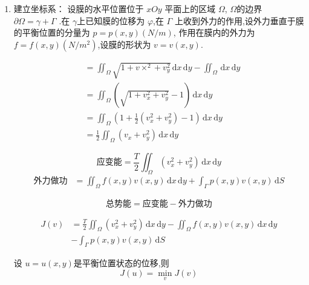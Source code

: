 \documentclass[../../PDE.tex]{subfiles}
\begin{document}
\begin{enumerate}
    \item 建立坐标系：
    设膜的水平位置位于 \(  xOy  \) 平面上的区域 \(   \Omega   \),  \(   \Omega   \)的边界 \(  \partial  \Omega =  \gamma +  \Gamma   \)   .在 \(   \gamma   \)上已知膜的位移为 \(   \varphi   \),在 \(   \Gamma   \)   上收到外力的作用,设外力垂直于膜的平衡位置的分量为 \(  p = p\left( x,y \right) \left( N /m \right)    \),
    作用在膜内的外力为 \(  f =  f\left( x,y \right)\left(  N / m^{2} \right)    \),设膜的形状为 \(  v =  v\left( x,y \right)   \).
    
    
    \[
    \begin{aligned}& =  \iint_{ \Omega } \sqrt{ 1+ v\times ^{2}+ v_{y}^{2}}\,\mathrm{d} x\,\mathrm{d} y - \iint_{ \Omega }\,\mathrm{d} x\,\mathrm{d} y \\ 
      & =  \iint_{  \Omega  } \left( \sqrt{1+ v_{x}^{2}+ v_{y}^{2}} -1\right)\,\mathrm{d} x\,\mathrm{d} y\\ 
       & =  \iint_{ \Omega } \left( 1+  \frac{1}{2}\left( v_{x}^{2}+ v_{y}^{2} \right)-1  \right)  \,\mathrm{d} x\,\mathrm{d} y\\ 
        & = \frac{1}{2} \iint_{ \Omega } \left( v_{x}+ v_{y}^{2} \right) \,\mathrm{d} x\,\mathrm{d} y
    \end{aligned}
    \]

    \[
    \text{应变能} =   \frac{T }{2 } \iint_{ \Omega } \left( v_{x}^{2}+ v_{y}^{2} \right) \,\mathrm{d} x\,\mathrm{d} y  
    \]
    \[
    \begin{aligned}
    \text{外力做功}& =  \iint_{ \Omega } f\left( x,y \right) v\left( x,y \right)\,\mathrm{d} x\,\mathrm{d} y +  \int_{ \Gamma }   p\left( x,y \right) v\left( x,y \right)\,\mathrm{d} S  
    \end{aligned}
    \]

    \[
    \text{总势能} =  \text{应变能} - \text{外力做功}
    \]

    \[
    \begin{aligned}
        J\left( v \right) & =  \frac{T }{2 } \iint_{ \Omega } \left( v_{x}^{2}+ v_{y}^{2} \right)\,\mathrm{d} x\,\mathrm{d} y - \iint_{ \Omega }f\left( x,y \right) v\left( x,y \right)\,\mathrm{d} x\,\mathrm{d} y\\ 
        & - \int_{ \Gamma }     p\left( x,y \right) v\left( x,y \right)\,\mathrm{d} S 
    \end{aligned}  
    \]

    设 \(  u =  u\left( x,y \right)   \)是平衡位置状态的位移,则 \[
    J\left( u \right)= \min _{v} J\left( v \right)  
    \] 


\end{enumerate}
\end{document}
